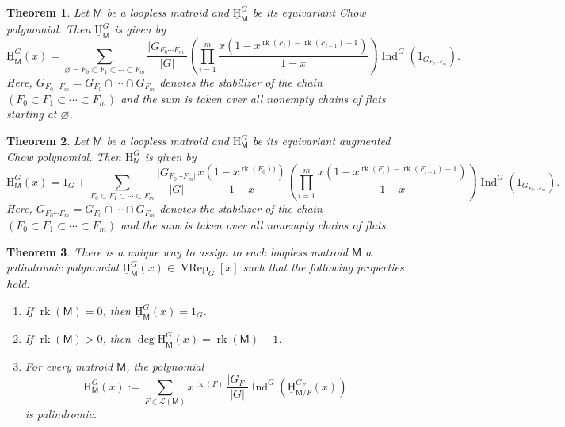 \documentclass[10pt, a4paper, english]{amsart}
\theoremstyle{teoremas}
\newtheorem{theorem}{Theorem}[section]
\theoremstyle{definition}
\DeclareMathOperator{\rk}{rk}
\newcommand{\M}{\mathsf{M}}
\renewcommand{\H}{\mathrm{H}}
\newcommand{\uH}{\underline{\mathrm{H}}}
\newcommand{\VRep}{\operatorname{VRep}}
\newcommand{\Ind}{\operatorname{Ind}}
\begin{document}
\begin{theorem}\label{thm:main-perm-rep}
    Let $\M$ be a loopless matroid and $\uH_{\M}^G$ be its equivariant Chow polynomial. Then $\uH_{\M}^G$ is given by
    \begin{equation}
        \uH_{\M}^G(x) = \sum_{\varnothing = F_0\subset F_1\subset\cdots\subset F_m}{\frac{|G_{F_0\cdots F_m|}}{|G|}
        \left(\prod_{i=1}^{m}{\frac{x(1-x^{\rk(F_i)-\rk(F_{i-1})-1})}{1-x}}\right)
        \Ind^G(1_{G_{F_0\cdots F_m}})}.
    \end{equation}
    Here, $G_{F_0\cdots F_m} = G_{F_0}\cap\cdots\cap G_{F_m}$ denotes the stabilizer of the chain $(F_0\subset F_1\subset\cdots\subset F_m)$
    and the sum is taken over all nonempty chains of flats starting at $\varnothing$.
\end{theorem}

\begin{theorem}\label{thm:main-perm-rep-augmented}
    Let $\M$ be a loopless matroid and $\H_{\M}^G$ be its equivariant augmented Chow polynomial. Then $\H_{\M}^G$ is given by
    \begin{equation}
        \H_{\M}^G(x) = 1_G + \sum_{F_0\subset F_1\subset\cdots\subset F_m}{\frac{|G_{F_0\cdots F_m|}}{|G|}
        \frac{x(1-x^{\rk(F_0))})}{1-x}
        \left(\prod_{i=1}^{m}{\frac{x(1-x^{\rk(F_i)-\rk(F_{i-1})-1})}{1-x}}\right)
        \Ind^G(1_{G_{F_0\cdots F_m}})}.
    \end{equation}
    Here, $G_{F_0\cdots F_m} = G_{F_0}\cap\cdots\cap G_{F_m}$ denotes the stabilizer of the chain $(F_0\subset F_1\subset\cdots\subset F_m)$
    and the sum is taken over all nonempty chains of flats.
\end{theorem}

\begin{theorem}\label{thm:equiv-main-recursion-defi-H-and-uH}
    There is a unique way to assign to each loopless matroid $\M$ a palindromic polynomial $\uH_{\M}^G(x) \in \VRep_G[x]$ such that the following properties hold:
    \begin{enumerate}[\normalfont(i)]
        \item If $\rk(\M) = 0$, then $\uH_{\M}^G(x) = 1_G$.\label{it:mainfirst}\
        \item If $\rk(\M) > 0$, then $\deg \uH_{\M}^G(x) = \rk(\M) - 1$.\label{it:mainsecond}
        \item For every matroid $\M$, the polynomial
            \[ \H_{\M}^G(x) := \sum_{F\in \mathcal{L}(\M)} x^{\rk(F)}\, \frac{|G_F|}{|G|}\Ind^G\left(\uH_{\M/F}^{G_F}(x)\right)\]
        is palindromic.\label{it:main-equiv-third}
    \end{enumerate}
\end{theorem}
\end{document}

